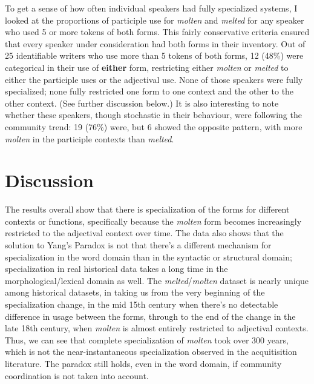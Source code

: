 \documentclass{artikel3}
\begin{document}
To get a sense of how often individual speakers had fully specialized systems, I looked at the proportions of participle use for \textsl{molten} and \textsl{melted} for any speaker who used 5 or more tokens of both forms. This fairly conservative criteria ensured that every speaker under consideration had both forms in their inventory. Out of 25 identifiable writers who use more than 5 tokens of both forms, 12 (48\%) were categorical in their use of \textbf{either} form, restricting either \textsl{molten} or \textsl{melted} to either the participle uses or the adjectival use. None of those speakers were fully specialized; none fully restricted one form to one context and the other to the other context. (See further discussion below.) It is also interesting to note whether these speakers, though stochastic in their behaviour, were following the community trend: 19 (76\%) were, but 6 showed the opposite pattern, with more \textsl{molten} in the participle contexts than \textsl{melted}.




\section{Discussion}
\label{discuss}

The results overall show that there is specialization of the forms for different contexts or functions, specifically because the \textsl{molten} form becomes increasingly restricted to the adjectival context over time. The data also shows that the solution to Yang's Paradox is not that there's a different mechanism for specialization in the word domain than in the syntactic or structural domain; specialization in real historical data takes a long time in the morphological/lexical domain as well. The \textsl{melted}/\textsl{molten} dataset is nearly unique among historical datasets, in taking us from the very beginning of the specialization change, in the mid 15th century when there's no detectable difference in usage between the forms, through to the end of the change in the late 18th century, when \textsl{molten} is almost entirely restricted to adjectival contexts. Thus, we can see that complete specialization of \textsl{molten} took over 300 years, which is not the near-instantaneous specialization observed in the acquitisition literature. The paradox still holds, even in the word domain, if community coordination is not taken into account.
\end{document}
